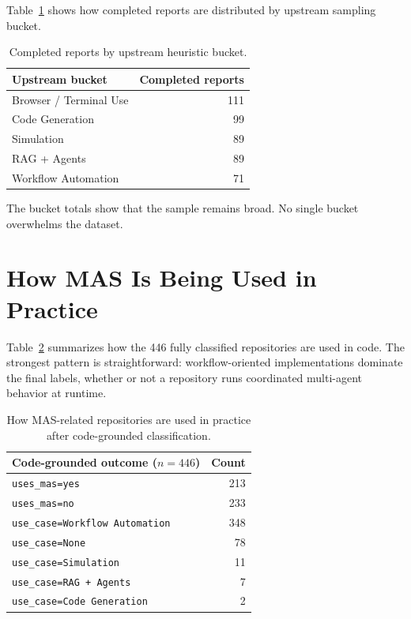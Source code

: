 \documentclass[12pt,a4paper,onecolumn]{article}
\begin{document}
Table~\ref{tab:bucket} shows how completed reports are distributed by upstream sampling bucket.

\begin{table}[ht]
\centering
\begin{tabular}{lr}
\toprule
Upstream bucket & Completed reports \\
\midrule
Browser / Terminal Use & 111 \\
Code Generation & 99 \\
Simulation & 89 \\
RAG + Agents & 89 \\
Workflow Automation & 71 \\
\bottomrule
\end{tabular}
\caption{Completed reports by upstream heuristic bucket.}
\label{tab:bucket}
\end{table}

The bucket totals show that the sample remains broad. No single bucket overwhelms the dataset.

\section{How MAS Is Being Used in Practice}
Table~\ref{tab:masuse} summarizes how the 446 fully classified repositories are used in code. The strongest pattern is straightforward: workflow-oriented implementations dominate the final labels, whether or not a repository runs coordinated multi-agent behavior at runtime.

\begin{table}[ht]
\centering
\begin{tabular}{lr}
\toprule
Code-grounded outcome (\(n=446\)) & Count \\
\midrule
\texttt{uses\_mas=yes} & 213 \\
\texttt{uses\_mas=no} & 233 \\
\texttt{use\_case=Workflow Automation} & 348 \\
\texttt{use\_case=None} & 78 \\
\texttt{use\_case=Simulation} & 11 \\
\texttt{use\_case=RAG + Agents} & 7 \\
\texttt{use\_case=Code Generation} & 2 \\
\bottomrule
\end{tabular}
\caption{How MAS-related repositories are used in practice after code-grounded classification.}
\label{tab:masuse}
\end{table}
\end{document}

